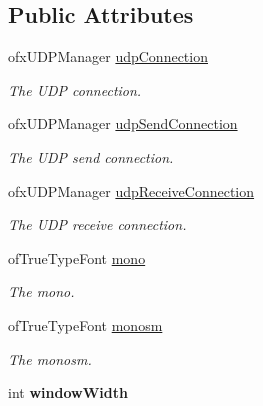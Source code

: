 \subsection*{Public Attributes}
\begin{DoxyCompactItemize}
\item 
\hypertarget{classtest_app_a30c39505591fda7ed8ef4d8c4f0128fd}{ofx\-U\-D\-P\-Manager \hyperlink{classtest_app_a30c39505591fda7ed8ef4d8c4f0128fd}{udp\-Connection}}\label{classtest_app_a30c39505591fda7ed8ef4d8c4f0128fd}

\begin{DoxyCompactList}\small\item\em The U\-D\-P connection. \end{DoxyCompactList}\item 
\hypertarget{classtest_app_a35f96e427475843d44539f125ca454cd}{ofx\-U\-D\-P\-Manager \hyperlink{classtest_app_a35f96e427475843d44539f125ca454cd}{udp\-Send\-Connection}}\label{classtest_app_a35f96e427475843d44539f125ca454cd}

\begin{DoxyCompactList}\small\item\em The U\-D\-P send connection. \end{DoxyCompactList}\item 
\hypertarget{classtest_app_a630d5b8b53aee0c07dc79db616f4eb48}{ofx\-U\-D\-P\-Manager \hyperlink{classtest_app_a630d5b8b53aee0c07dc79db616f4eb48}{udp\-Receive\-Connection}}\label{classtest_app_a630d5b8b53aee0c07dc79db616f4eb48}

\begin{DoxyCompactList}\small\item\em The U\-D\-P receive connection. \end{DoxyCompactList}\item 
\hypertarget{classtest_app_a9bcefa3afb830941451f72174a36b722}{of\-True\-Type\-Font \hyperlink{classtest_app_a9bcefa3afb830941451f72174a36b722}{mono}}\label{classtest_app_a9bcefa3afb830941451f72174a36b722}

\begin{DoxyCompactList}\small\item\em The mono. \end{DoxyCompactList}\item 
\hypertarget{classtest_app_afc42ad25d37b1292d27d783380249424}{of\-True\-Type\-Font \hyperlink{classtest_app_afc42ad25d37b1292d27d783380249424}{monosm}}\label{classtest_app_afc42ad25d37b1292d27d783380249424}

\begin{DoxyCompactList}\small\item\em The monosm. \end{DoxyCompactList}\item 
\hypertarget{group___int_variables_ga9ed611377cd46f5148a3a3d538e96484}{int {\bfseries window\-Width}}\label{group___int_variables_ga9ed611377cd46f5148a3a3d538e96484}


\end{DoxyCompactItemize}
